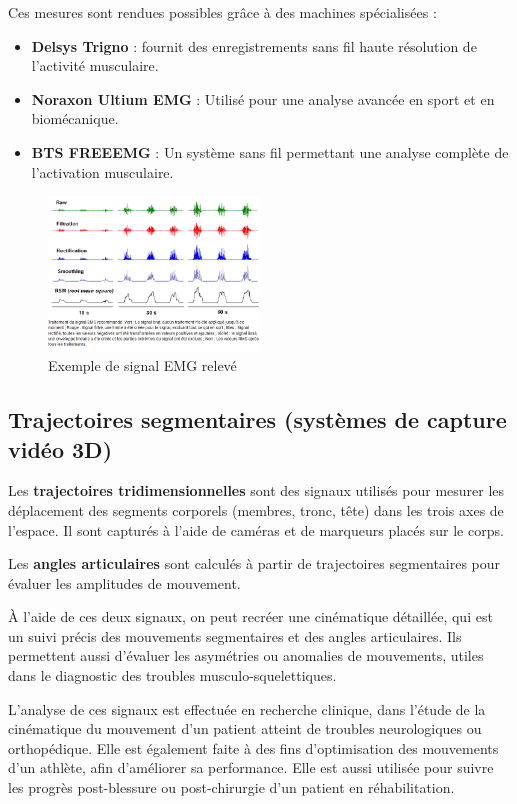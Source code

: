 Ces mesures sont rendues possibles grâce à des machines spécialisées : 
\begin{itemize}
  \item \textbf{Delsys Trigno} : fournit des enregistrements sans fil haute résolution de l’activité musculaire.
  \item \textbf{Noraxon Ultium EMG} : Utilisé pour une analyse avancée en sport et en biomécanique.
  \item \textbf{BTS FREEEMG} : Un système sans fil permettant une analyse complète de l’activation musculaire.
\end{itemize}

\begin{figure}[ht]
  \centering
  \includegraphics[width=0.5\textwidth]{images/emg.png}
  \caption{Exemple de signal EMG relevé}\label{fig:emg}
\end{figure}


\subsection{Trajectoires segmentaires (systèmes de capture vidéo 3D)}

Les \textbf{trajectoires tridimensionnelles} sont des signaux utilisés pour mesurer les déplacement des segments corporels (membres, tronc, tête) dans les trois axes de l'espace.
Il sont capturés à l'aide de caméras et de marqueurs placés sur le corps.

Les \textbf{angles articulaires} sont calculés à partir de trajectoires segmentaires pour évaluer les amplitudes de mouvement.

À l'aide de ces deux signaux, on peut recréer une cinématique détaillée, qui est un suivi précis des mouvements segmentaires et des angles articulaires.
Ils permettent aussi d'évaluer les asymétries ou anomalies de mouvements, utiles dans le diagnostic des troubles musculo-squelettiques.

L'analyse de ces signaux est effectuée en recherche clinique, dans l'étude de la cinématique du mouvement d'un patient atteint de troubles neurologiques ou orthopédique.
Elle est également faite à des fins d'optimisation des mouvements d'un athlète, afin d'améliorer sa performance.
Elle est aussi utilisée pour suivre les progrès post-blessure ou post-chirurgie d'un patient en réhabilitation.

